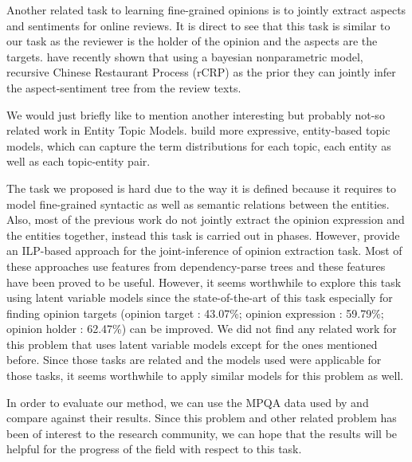 \documentclass{article}
\begin{document}
Another related task to learning fine-grained opinions is to jointly extract aspects and sentiments for online reviews. It is direct to see that this task is similar to our task as the reviewer is the holder of the opinion and the aspects are the targets. \cite{Kim} have recently shown that using a bayesian nonparametric model, recursive Chinese Restaurant Process (rCRP) as the prior they can jointly infer the aspect-sentiment tree from the review texts. 

We would just briefly like to mention another interesting but probably not-so related work in Entity Topic Models. \cite{kim_etm} build more expressive, entity-based topic models, which can capture the term distributions for each topic, each entity as well as each topic-entity pair.

The task we proposed is hard due to the way it is defined because it requires to model fine-grained syntactic as well as semantic relations between the entities. Also, most of the previous work do not jointly extract the opinion expression and the entities together, instead this task is carried out in phases. However, \cite{bishan} provide an ILP-based approach for the joint-inference of opinion extraction task. Most of these approaches use features from dependency-parse trees and these features have been proved to be useful. However, it seems worthwhile to explore this task using latent variable models since the state-of-the-art of this task especially for finding opinion targets (opinion target : 43.07\%; opinion expression : 59.79\%; opinion holder : 62.47\%) can be improved. We did not find any related work for this problem that uses latent variable models except for the ones mentioned before. Since those tasks are related and the models used were applicable for those tasks, it seems worthwhile to apply similar models for this problem as well.

In order to evaluate our method, we can use the MPQA data used by \cite{bishan} and compare against their results. Since this problem and other related problem has been of interest to the research community, we can hope that the results will be helpful for the progress of the field with respect to this task.




\end{document}
